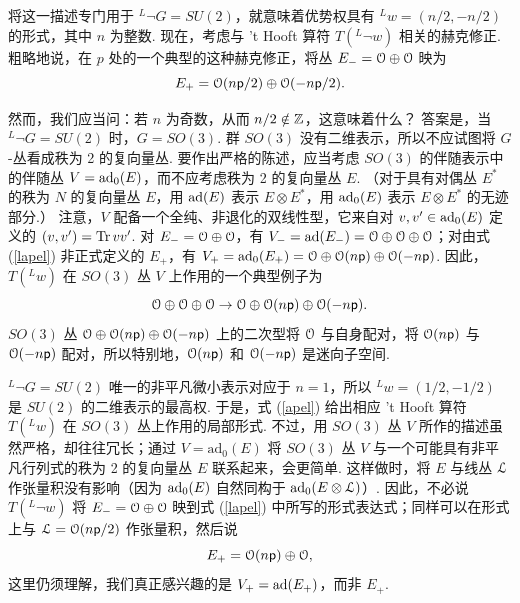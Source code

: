 将这一描述专门用于 $^L\neg G=SU(2)$，就意味着优势权具有 $^Lw=(n/2,-n/2)$ 的形式，其中 $n$ 为整数.
现在，考虑与 't Hooft 算符 $T(^L\neg w)$ 相关的赫克修正.
粗略地说，在 $p$ 处的一个典型的这种赫克修正，将丛 $E_-={\mathcal O}\oplus {\mathcal O}$ 映为
\begin{equation}\label{lapel}E_+={\mathcal O}(n{\sf p}/2)\oplus {\mathcal O}(-n{\sf p}/2).  \end{equation}

然而，我们应当问：若 $n$ 为奇数，从而 $n/2\notin{\mathbb Z}$，这意味着什么？
答案是，当 $^L\neg G=SU(2)$ 时，$G=SO(3)$.
群 $SO(3)$ 没有二维表示，所以不应试图将 $G$-丛看成秩为 2 的复向量丛.
要作出严格的陈述，应当考虑 $SO(3)$ 的伴随表示中的伴随丛 $V={\rm ad}_0(E)$，而不应考虑秩为 2 的复向量丛 $E$.
（对于具有对偶丛 $E^*$ 的秩为 $N$ 的复向量丛 $E$，用 ${\rm ad}(E)$ 表示 $E\otimes E^*$，用 ${\rm ad}_0(E)$ 表示 $E\otimes E^*$ 的无迹部分.）
注意，$V$ 配备一个全纯、非退化的双线性型，它来自对 $v,v'\in {\rm ad}_0(E)$ 定义的 $(v,v')={\rm Tr}\,vv'$.
对 $E_-={\mathcal O}\oplus {\mathcal O}$，有 $V_-={\rm ad}(E_-)
={\mathcal O}\oplus {\mathcal O}\oplus{\mathcal O}$；对由式 (\ref{lapel}) 非正式定义的 $E_+$，有 $V_+={\rm ad}_0(E_+)={\mathcal O}\oplus {\mathcal O}(n{\sf p})\oplus {\mathcal O}(-n{\sf p})$.
因此，$T(^Lw)$ 在 $SO(3)$ 丛 $V$ 上作用的一个典型例子为
\begin{equation}\label{apel}{\mathcal O}\oplus{\mathcal O}\oplus {\mathcal O}\to {\mathcal O}\oplus {\mathcal O}(n{\sf p})\oplus {\mathcal O}(-n{\sf p}). \end{equation}
$SO(3)$ 丛 ${\mathcal O}\oplus {\mathcal O}(n{\sf p})\oplus {\mathcal O}(-n{\sf p})$ 上的二次型将 ${\mathcal O}$ 与自身配对，将 ${\mathcal O}(n{\sf p})$ 与 ${\mathcal O}(-n{\sf p})$ 配对，所以特别地，${\mathcal O}(n{\sf p})$ 和 ${\mathcal O}(-n{\sf p})$ 是迷向子空间.

$^L\neg G=SU(2)$ 唯一的非平凡微小表示对应于 $n=1$，所以 $^Lw=(1/2,-1/2)$ 是 $SU(2)$ 的二维表示的最高权.
于是，式 (\ref{apel}) 给出相应 't Hooft 算符 $T(^Lw)$ 在 $SO(3)$ 丛上作用的局部形式.
不过，用 $SO(3)$ 丛 $V$ 所作的描述虽然严格，却往往冗长；通过 $V=\mathrm{ad}_0(E)$ 将 $SO(3)$ 丛 $V$ 与一个可能具有非平凡行列式的秩为 2 的复向量丛 $E$ 联系起来，会更简单.
这样做时，将 $E$ 与线丛 ${\mathcal L}$ 作张量积没有影响（因为 ${\rm ad}_0(E)$ 自然同构于 ${\rm ad}_0(E\otimes {\mathcal L})$）.
因此，不必说 $T(^L\neg w)$ 将 $E_-={\mathcal O}\oplus {\mathcal O}$ 映到式 (\ref{lapel}) 中所写的形式表达式；同样可以在形式上与 ${\mathcal L}={\mathcal O}(n{\sf p}/2)$ 作张量积，然后说
\begin{equation}\label{zapel} E_+={\mathcal O}(n{\sf p})\oplus {\mathcal O},\end{equation}
这里仍须理解，我们真正感兴趣的是 $V_+={\rm ad}(E_+)$，而非 $E_+$.

